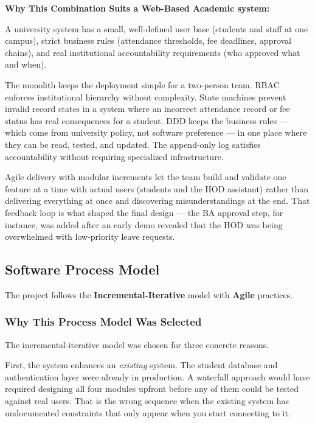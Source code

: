 \textbf{Why This Combination Suits a Web-Based Academic system:}

A university system has a small, well-defined user base (students and staff at one
campus), strict business rules (attendance thresholds, fee deadlines, approval chains),
and real institutional accountability requirements (who approved what and when).

The monolith keeps the deployment simple for a two-person team. RBAC enforces
institutional hierarchy without complexity. State machines prevent invalid record states
in a system where an incorrect attendance record or fee status has real consequences for
a student. DDD keeps the business rules — which come from university policy, not
software preference — in one place where they can be read, tested, and updated. The
append-only log satisfies accountability without requiring specialized infrastructure.

Agile delivery with modular increments let the team build and validate one feature at
a time with actual users (students and the HOD assistant) rather than delivering
everything at once and discovering misunderstandings at the end. That feedback loop is
what shaped the final design — the BA approval step, for instance, was added
after an early demo revealed that the HOD was being overwhelmed with low-priority leave
requests.

\subsection{Software Process Model}

The project follows the \textbf{Incremental-Iterative} model with \textbf{Agile} practices.

\subsubsection{Why This Process Model Was Selected}

The incremental-iterative model was chosen for three concrete reasons.

First, the system enhances an \textit{existing} system. The student database and
authentication layer were already in production. A waterfall approach would have
required designing all four modules upfront before any of them could be tested against
real users. That is the wrong sequence when the existing system has undocumented
constraints that only appear when you start connecting to it.

